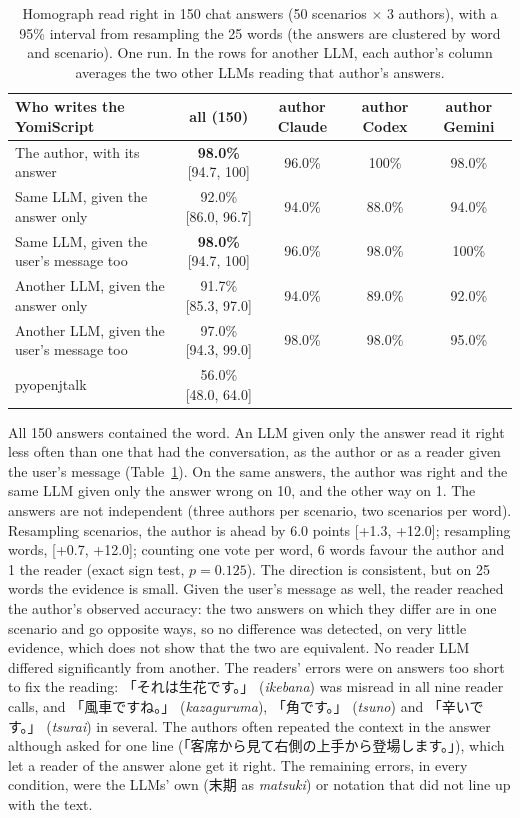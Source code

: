 \documentclass[11pt,a4paper]{article}
\begin{document}
\begin{table}[t]
\centering\small
\caption{Homograph read right in 150 chat answers (50 scenarios $\times$ 3 authors), with a 95\% interval from
resampling the 25 words (the answers are clustered by word and scenario). One run. In the rows for another LLM, each author's column averages the two other LLMs reading
that author's answers.}
\label{tab:author}
\begin{tabular}{lcccc}
\toprule
Who writes the YomiScript & all (150) & author Claude & author Codex & author Gemini\\
\midrule
The author, with its answer & \textbf{98.0\%} [94.7, 100] & 96.0\% & 100\% & 98.0\%\\
Same LLM, given the answer only & 92.0\% [86.0, 96.7] & 94.0\% & 88.0\% & 94.0\%\\
Same LLM, given the user's message too & \textbf{98.0\%} [94.7, 100] & 96.0\% & 98.0\% & 100\%\\
Another LLM, given the answer only & 91.7\% [85.3, 97.0] & 94.0\% & 89.0\% & 92.0\%\\
Another LLM, given the user's message too & 97.0\% [94.3, 99.0] & 98.0\% & 98.0\% & 95.0\%\\
pyopenjtalk & 56.0\% [48.0, 64.0] & & & \\
\bottomrule
\end{tabular}
\end{table}

All 150 answers contained the word. An LLM given only the answer read it right less often than one that had the
conversation, as the author or as a reader given the user's message (Table~\ref{tab:author}). On the same answers, the author was right and the same LLM given only the answer wrong on
10, and the other way on 1. The answers are not independent (three authors per scenario, two scenarios per word). Resampling
scenarios, the author is ahead by 6.0 points [+1.3, +12.0]; resampling words, [+0.7, +12.0]; counting one vote per
word, 6 words favour the author and 1 the reader (exact sign test, $p = 0.125$). The direction is consistent, but
on 25 words the evidence is small. Given the user's message as well, the reader reached the author's observed
accuracy: the two answers on which they differ are in one scenario and go opposite ways, so no difference was
detected, on very little evidence, which does not show that the two are equivalent. No reader LLM differed
significantly from another. The readers' errors
were on answers too short to fix the reading: 「それは生花です。」 (\emph{ikebana}) was misread in all nine reader
calls, and 「風車ですね。」 (\emph{kazaguruma}), 「角です。」 (\emph{tsuno}) and 「辛いです。」 (\emph{tsurai}) in several.
The authors often repeated the context in the answer although asked for one line
(「客席から見て右側の上手から登場します。」), which let a reader of the answer alone get it right. The remaining
errors, in every condition, were the LLMs' own (末期 as \emph{matsuki}) or notation that did not line up with the text.
\end{document}
